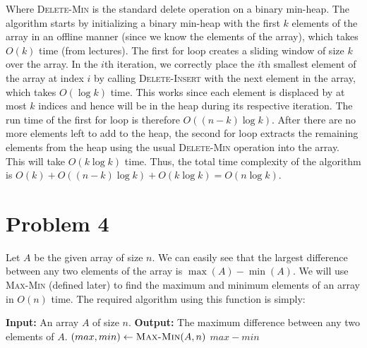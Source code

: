 \documentclass{article}
\begin{document}
  Where \textsc{Delete-Min} is the standard delete operation on a binary min-heap.
  The algorithm starts by initializing a binary min-heap with the first $k$ elements of the array in an offline manner (since we know the elements of the array), which takes $O(k)$ time (from lectures).
  The first for loop creates a sliding window of size $k$ over the array.
  In the $i$th iteration, we correctly place the $i$th smallest element of the array at index $i$ by calling \textsc{Delete-Insert} with the next element in the array, which takes $O(\log k)$ time.
  This works since each element is displaced by at most $k$ indices and hence will be in the heap during its respective iteration.
  The run time of the first for loop is therefore $O((n - k) \log k)$.
  After there are no more elements left to add to the heap, the second for loop extracts the remaining elements from the heap using the usual \textsc{Delete-Min} operation into the array.
  This will take $O(k \log k)$ time.
  Thus, the total time complexity of the algorithm is $O(k) + O((n - k) \log k) + O(k \log k) = O(n \log k)$.

\section{Problem 4}
  Let $A$ be the given array of size $n$.
  We can easily see that the largest difference between any two elements of the array is $\max(A) - \min(A)$.
  We will use \textsc{Max-Min} (defined later) to find the maximum and minimum elements of an array in $O(n)$ time.
  The required algorithm using this function is simply:
  \begin{algorithm}[H]
    \caption{Find the maximum difference between any two elements of an array}
    \begin{algorithmic}[1]
      \State \textbf{Input:} An array $A$ of size $n$.
      \State \textbf{Output:} The maximum difference between any two elements of $A$.
      \State $(max, min) \gets \textsc{Max-Min}(A, n)$
      \State \Return $max - min$
    \end{algorithmic}
  \end{algorithm}
\end{document}
